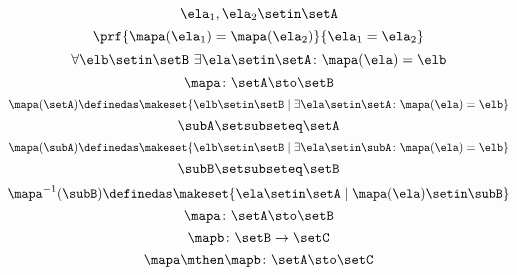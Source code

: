 \begin{forslides}
    \begin{equation}
        \label{eq:slides_session2_122}
        \ela_1, \ela_2 \setin\setA
    \end{equation}
    \begin{equation}
        \label{eq:slides_session2_123}
        \prf{\mapa(\ela_1) = \mapa(\ela_2)}{\ela_1 = \ela_2}
    \end{equation}
    \begin{equation}
        \label{eq:slides_session2_124}
        \forall \elb \setin\setB \ \exists  \ela \setin\setA \colon \mapa(\ela) = \elb
    \end{equation}
    \begin{equation}
        \label{eq:slides_session2_125}
        \mapa\colon \setA \sto \setB
    \end{equation}
    \begin{equation}
        \label{eq:slides_session2_126}
        \mapa(\setA) \definedas \makeset{ \elb \setin\setB \mid \exists \ela \setin\setA \colon \mapa(\ela) = \elb }
    \end{equation}
    \begin{equation}
        \label{eq:slides_session2_127}
        \subA \setsubseteq \setA
    \end{equation}
    \begin{equation}
        \label{eq:slides_session2_128}
        \mapa(\subA) \definedas \makeset{ \elb \setin\setB \mid \exists \ela \setin \subA \colon \mapa(\ela) = \elb }
    \end{equation}
    \begin{equation}
        \label{eq:slides_session2_129}
        \subB \setsubseteq \setB
    \end{equation}
    \begin{equation}
        \label{eq:slides_session2_130}
        \mapa^{-1}(\subB) \definedas \makeset{ \ela \setin\setA \mid  \mapa(\ela) \setin \subB}
    \end{equation}
    \begin{equation}
        \label{eq:slides_session2_131}
        \mapa\colon \setA \sto \setB
    \end{equation}
    \begin{equation}
        \label{eq:slides_session2_132}
        \mapb \colon \setB \to \setC
    \end{equation}
    \begin{equation}
        \label{eq:slides_session2_133}
        \mapa \mthen \mapb \colon \setA \sto \setC
    \end{equation}

\end{forslides}
